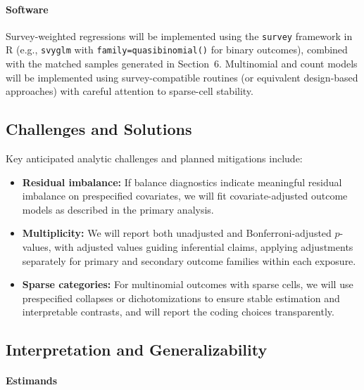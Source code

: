 \documentclass{article}
\begin{document}
\paragraph{Software}

Survey-weighted regressions will be implemented using the \texttt{survey} framework in R (e.g., \texttt{svyglm} with \texttt{family=quasibinomial()} for binary outcomes), combined with the matched samples generated in Section~6. Multinomial and count models will be implemented using survey-compatible routines (or equivalent design-based approaches) with careful attention to sparse-cell stability.

\subsection{Challenges and Solutions}

Key anticipated analytic challenges and planned mitigations include:

\begin{itemize}
    \item \textbf{Residual imbalance:} If balance diagnostics indicate meaningful residual imbalance on prespecified covariates, we will fit covariate-adjusted outcome models as described in the primary analysis.

    \item \textbf{Multiplicity:} We will report both unadjusted and Bonferroni-adjusted $p$-values, with adjusted values guiding inferential claims, applying adjustments separately for primary and secondary outcome families within each exposure.

    \item \textbf{Sparse categories:} For multinomial outcomes with sparse cells, we will use prespecified collapses or dichotomizations to ensure stable estimation and interpretable contrasts, and will report the coding choices transparently.
\end{itemize}


\subsection{Interpretation and Generalizability}

\paragraph{Estimands}
\end{document}
